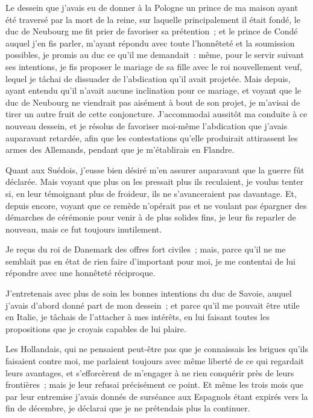 \documentclass[french,twoside]{book} %
\begin{document}
Le dessein que j’avais eu de donner à la Pologne un prince de ma maison ayant été traversé par la mort de la reine, sur laquelle principalement il était fondé, le duc de Neubourg me fit prier de favoriser sa prétention ; et le prince de Condé auquel j’en fis parler, m’ayant répondu avec toute l’honnêteté et la soumission possibles, je promis au duc ce qu’il me demandait : même, pour le servir suivant ses intentions, je fis proposer le mariage de sa fille avec le roi nouvellement veuf, lequel je tâchai de dissuader de l’abdication qu’il avait projetée. Mais depuis, ayant entendu qu’il n’avait aucune inclination pour ce mariage, et voyant que le duc de Neubourg ne viendrait pas aisément à bout de son projet, je m’avisai de tirer un autre fruit de cette conjoncture. J’accommodai aussitôt ma conduite à ce nouveau dessein, et je résolus de favoriser moi-même l’abdication que j’avais auparavant retardée, afin que les contestations qu’elle produirait attirassent les armes des Allemands, pendant que je m’établirais en Flandre.\par
Quant aux Suédois, j’eusse bien désiré m’en assurer auparavant que la guerre fût déclarée. Mais voyant que plus on les pressait plus ils reculaient, je voulus tenter si, en leur témoignant plus de froideur, ils ne s’avanceraient pas davantage. Et, depuis encore, voyant que ce remède n’opérait pas et ne voulant pas épargner des démarches de cérémonie pour venir à de plus solides fins, je leur fis reparler de nouveau, mais ce fut toujours inutilement.\par
Je reçus du roi de Danemark des offres fort civiles ; mais, parce qu’il ne me semblait pas en état de rien faire d’important pour moi, je me contentai de lui répondre avec une honnêteté réciproque.\par
J’entretenais avec plus de soin les bonnes intentions du duc de Savoie, auquel j’avais d’abord donné part de mon dessein ; et parce qu’il me pouvait être utile en Italie, je tâchais de l’attacher à mes intérêts, en lui faisant toutes les propositions que je croyais capables de lui plaire.\par
Les Hollandais, qui ne pensaient peut-être pas que je connaissais les brigues qu’ils faisaient contre moi, me parlaient toujours avec même liberté de ce qui regardait leurs avantages, et s’efforcèrent de m’engager à ne rien conquérir près de leurs frontières ; mais je leur refusai précisément ce point. Et même les trois mois que par leur entremise j’avais donnés de surséance aux Espagnols étant expirés vers la fin de décembre, je déclarai que je ne prétendais plus la continuer.\par
\end{document}
